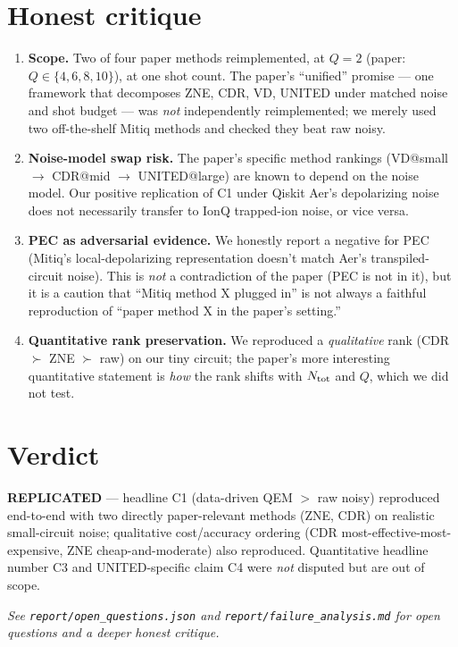 \documentclass[11pt]{article}
\begin{document}
\section{Honest critique}
\begin{enumerate}
  \item \textbf{Scope.}  Two of four paper methods reimplemented, at
    $Q=2$ (paper: $Q\in\{4,6,8,10\}$), at one shot count.  The paper's
    ``unified'' promise --- one framework that decomposes ZNE, CDR,
    VD, UNITED under matched noise and shot budget --- was
    \emph{not} independently reimplemented; we merely used two
    off-the-shelf Mitiq methods and checked they beat raw noisy.
  \item \textbf{Noise-model swap risk.}  The paper's specific method
    rankings (VD@small $\to$ CDR@mid $\to$ UNITED@large) are known to
    depend on the noise model.  Our positive replication of C1
    under Qiskit Aer's depolarizing noise does not necessarily
    transfer to IonQ trapped-ion noise, or vice versa.
  \item \textbf{PEC as adversarial evidence.}  We honestly report a
    negative for PEC (Mitiq's local-depolarizing representation
    doesn't match Aer's transpiled-circuit noise).  This is
    \emph{not} a contradiction of the paper (PEC is not in it), but it
    is a caution that ``Mitiq method X plugged in'' is not always a
    faithful reproduction of ``paper method X in the paper's setting.''
  \item \textbf{Quantitative rank preservation.} We reproduced a
    \emph{qualitative} rank (CDR $\succ$ ZNE $\succ$ raw) on our tiny
    circuit; the paper's more interesting quantitative statement is
    \emph{how} the rank shifts with $N_{\rm tot}$ and $Q$, which we
    did not test.
\end{enumerate}

\section{Verdict}
\textbf{REPLICATED} --- headline C1 (data-driven QEM $>$ raw noisy)
reproduced end-to-end with two directly paper-relevant methods
(ZNE, CDR) on realistic small-circuit noise; qualitative
cost/accuracy ordering (CDR most-effective-most-expensive, ZNE
cheap-and-moderate) also reproduced.  Quantitative headline number C3
and UNITED-specific claim C4 were \emph{not} disputed but are out of
scope.

\bigskip
\noindent\emph{See \texttt{report/open\_questions.json}
and \texttt{report/failure\_analysis.md} for open questions and a
deeper honest critique.}


\end{document}
